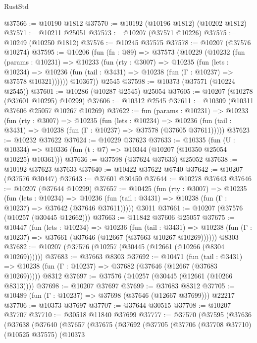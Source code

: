 \begin{lexlean}{RustStd}
\begin{coremodule}
@37566 := @10190 @1812
@37570 := @10192 (@10196 @1812) (@10202 @1812)
@37571 := @10211 @25051
@37573 := @10207 (@37571 @10226)
@37575 := @10249 (@10250 @1812)
@37576 := @10245 @37575
@37578 := @10207 (@37576 @10274)
@37595 := @10206
    (fun (fn : @89) =>
    @37573
      (@10229
        (@10232
          (fun (params : @10231) =>
          @10233
            (fun (rty : @3007) =>
            @10235
              (fun (lets : @10234) =>
              @10236 (fun (tail : @3431) => @10238 (fun (Γ : @10237) => @37578 @10321))))))
        @10367))
    @2545
@37598 := @10373 (@37571 (@10224 @2545))
@37601 := @10286 (@10287 @2545) @25054
@37605 := @10207 (@10278 (@37601 @10295) @10299)
@37606 := @10312 @2545
@37611 := @10309 (@10311 @37606 @25057 @10267 @10269)
@37622 := fun (params : @10231) =>
  @10233
    (fun (rty : @3007) =>
    @10235
      (fun (lets : @10234) =>
      @10236 (fun (tail : @3431) => @10238 (fun (Γ : @10237) => @37578 (@37605 @37611)))))
@37623 := @10232 @37622
@37624 := @10229 @37623
@37633 := @10335
    (fun (U : @10334) => @10336 (fun (t : @7) => @10344 (@10207 (@10350 @25054 @10225) @10361)))
@37636 := @37598 (@37624 @37633) @25052
@37638 := @10192 @37623 @37633
@37640 := @10422 @37622 @6740
@37642 := @10207 (@37576 @30447)
@37643 := @37601 @30450
@37644 := @10278 @37643
@37646 := @10207 (@37644 @10299)
@37657 := @10425
    (fun (rty : @3007) =>
    @10235
      (fun (lets : @10234) =>
      @10236 (fun (tail : @3431) => @10238 (fun (Γ : @10237) => @37642 (@37646 @37611)))))
    @3011
@37661 := @10207 (@37576 (@10257 (@30445 @12662)))
@37663 := @11842 @37606 @25057
@37675 := @10447
    (fun (lets : @10234) =>
    @10236
      (fun (tail : @3431) =>
      @10238 (fun (Γ : @10237) => @37661 (@37646 (@12667 (@37663 @10267 @10269))))))
    @8303
@37682 := @10207 (@37576 (@10257 (@30445 (@12661 (@10266 (@8304 @10269))))))
@37683 := @37663 @8303
@37692 := @10471
    (fun (tail : @3431) => @10238 (fun (Γ : @10237) => @37682 (@37646 (@12667 (@37683 @10269)))))
    @8312
@37697 := @37576 (@10257 (@30445 (@12661 (@10266 @8313))))
@37698 := @10207 @37697
@37699 := @37683 @8312
@37705 := @10489 (fun (Γ : @10237) => @37698 (@37646 (@12667 @37699))) @22217
@37706 := @10373 @37697
@37707 := @37644 @30515
@37708 := @10207 @37707
@37710 := @30518 @11840 @37699
@37777 := @37570
    (@37595
      (@37636
        (@37638
          (@37640
            (@37657
              (@37675
                (@37692
                  (@37705
                    (@37706
                      (@37708 @37710)
                      (@10525 @37575)
                      (@10373

\end{coremodule}
\end{lexlean}
